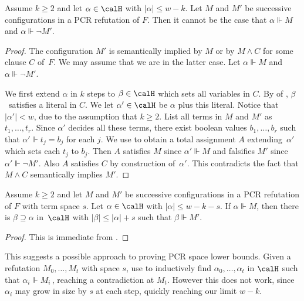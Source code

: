 \documentclass{toc}
\begin{document}
\begin{lemma}\label{lem:forcing-soundness}
Assume $k \ge 2$ and let $\alpha \in \calH$ with $|\alpha| \le w-k$. 
Let $M$ and $M'$ be successive configurations in a PCR refutation of $F$.
Then it cannot be the case that $\alpha \Vdash M$ and $\alpha \Vdash \neg M'$.
\end{lemma}

\begin{proof}
The configuration $M'$ is semantically implied by $M$ or by 
$M \land C$ for some clause $C$ of~$F$. 
We may assume that we are in the latter case.
Let $\alpha \Vdash M$ and $\alpha \Vdash \neg M'$.
 
We first extend $\alpha$ in 
$k$ steps to $\beta \in \calH$ which sets all variables in $C$.
By 
of , $\beta$~satisfies a literal in $C$.
We let $\alpha' \in \calH$ be $\alpha$ plus this literal. 
Notice that~$|\alpha'| < w$, due to the assumption that $k \ge 2$.
List all terms in $M$ and $M'$ as $t_1, \ldots, t_r$.
Since $\alpha'$ decides all these terms, 
there exist boolean values $b_1, \ldots, b_{r}$ such that
$\alpha' \Vdash t_j = b_j$ for each $j$. 
We use 
to obtain a total assignment $A$ extending~$\alpha'$ 
which sets each $t_j$ to $b_j$. 
Then $A$ satisfies $M$ since $\alpha' \Vdash M$ 
and falsifies $M'$ since~$\alpha' \Vdash \neg M'$.
Also $A$ satisfies $C$
by  construction of~$\alpha'$. This contradicts
the fact that $M \wedge C$ semantically implies $M'$.
\end{proof}



\begin{corollary} \label{cor:extend_one_step}
Assume $k \ge 2$ and let $M$ and $M'$ be successive configurations in
a PCR refutation of $F$ with term space $s$.
Let $\alpha \in \calH$ with $|\alpha|\le w-k-s$.
If $\alpha \Vdash M$, then there is $\beta \supseteq \alpha$
in~$\calH$ with $|\beta| \le |\alpha|+s$ such that 
$\beta \Vdash M'$.
\end{corollary}

\begin{proof}
This is immediate from 
.   %
\end{proof}

This suggests a possible approach to proving PCR space lower bounds.
Given a refutation $M_0, \dots, M_t$ with space $s$,
use  to
inductively find $\alpha_0, \dots, \alpha_t$ in $\calH$
such that $\alpha_i \Vdash M_i$\,, reaching a contradiction
at $M_t$. However this does not work, since $\alpha_i$
may grow in size by $s$ at each step, quickly reaching
our limit $w-k$. 
\end{document}
